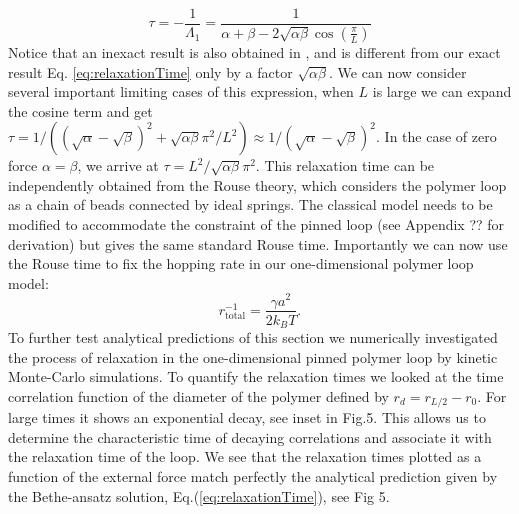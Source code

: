 \documentclass[aps,showpacs,twocolumn,floatfix,prx,superscriptaddress]{revtex4-1}
\begin{document}
\begin{equation}
    \label{eq:relaxationTime}
    \tau = -\frac{1}{\Lambda_1} = \frac{1}{\alpha+\beta-2\sqrt{\alpha\beta}\cos(\frac{\pi}{L})}
\end{equation}
Notice that an inexact result is also obtained in \cite{}, and is different from our exact result Eq. \eqref{eq:relaxationTime} only by a factor $\sqrt{\alpha\beta}$. We can now consider several important limiting cases of this expression, when $L$ is large we can expand the cosine term and get $\tau = 1/\left((\sqrt{\alpha}-\sqrt{\beta})^2 + \sqrt{\alpha\beta}\pi^2/L^2\right)\approx 1/(\sqrt{\alpha}-\sqrt{\beta})^2$. In the case of zero force $\alpha=\beta$, we arrive at $\tau=L^2/\sqrt{\alpha\beta}\pi^2$. This relaxation time can be independently obtained from the Rouse theory, which considers the polymer loop as a chain of beads connected by ideal springs. The classical model \cite{} needs to be modified to accommodate the constraint of the pinned loop (see Appendix ?? for derivation) but gives the same standard Rouse time. Importantly we can now use the Rouse time to fix the hopping rate in our one-dimensional polymer loop model:
\begin{equation}
    \label{eq:timeScale_corrected}
    r_{\text{total}}^{-1} = \frac{\gamma a^2}{2k_{B}T}.
\end{equation}
 To further test analytical predictions of this section we numerically investigated the process of relaxation in the one-dimensional pinned polymer loop by kinetic Monte-Carlo simulations. To quantify the relaxation times we looked at the time correlation function of the diameter of the polymer defined by $r_d = r_{L/2} - r_0$. For large times it shows an exponential decay, see inset in Fig.5. This allows us to determine the characteristic time of decaying correlations and associate it with the relaxation time of the loop. We see that the relaxation times plotted as a function of the external force match perfectly the analytical prediction given by the Bethe-ansatz solution, Eq.(\ref{eq:relaxationTime}), see Fig 5.
\end{document}
